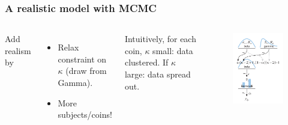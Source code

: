 \documentclass[usenames,dvipsnames,table]{beamer}
\begin{document}
\begin{frame}
\frametitle{A realistic model with MCMC}
\begin{columns}[c]
Add realism by
\begin{itemize}
\item Relax constraint on $\kappa$ (draw from Gamma).
\item More subjects/coins!
\end{itemize}
Intuitively, for each coin, $\kappa$ small: data clustered. If $\kappa$ large: data spread out. 
\begin{figure}
\centering
\includegraphics[width=\linewidth]{img/fig9_7}
\end{figure}
\end{columns}
\end{frame}
\end{document}
